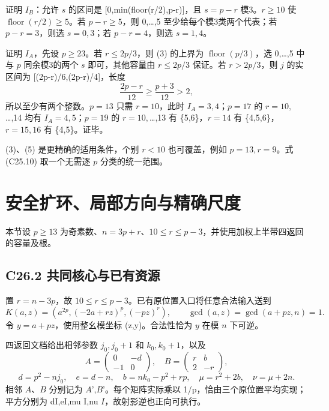 {证明} {\ensuremath{I_{B}}：允许} {\ensuremath{s}} {的区间是} {{[}0,min(floor(r/2),p-r){]}，且} {\ensuremath{s=p-r}} {模3。\ensuremath{r\ge 10}} {使} {\ensuremath{\operatorname{floor}(r/2)\ge 5}。若} {\ensuremath{p-r\ge 5}，则} {0,\ldots,5} {至少给每个模3类两个代表；若} {\ensuremath{p-r=3}，则选} {\ensuremath{s=0,3}；若} {\ensuremath{p-r=4}，则选} {\ensuremath{s=1,4}。}

{证明} {\ensuremath{I_{A}}，先设} {\ensuremath{p\ge 23}。若} {\ensuremath{r\le 2p/3}，则} {(3)} {的上界为} {\ensuremath{\operatorname{floor}(p/3)}，选} {0,\ldots,5} {中与} {\ensuremath{p}} {同余模3的两个} {\ensuremath{s}} {即可，其他容量由} {\ensuremath{r\le 2p/3}} {保证。若} {\ensuremath{r>2p/3}，则} {\ensuremath{j}} {的实区间为} {{[}(2p-r)/6,(2p-r)/4{]}，长度} \[
\frac{2p-r}{12}\ge\frac{p+3}{12}>2,
\] {所以至少有两个整数。\ensuremath{p=13}} {只需} {\ensuremath{r=10}，此时} {\ensuremath{I_{A}={3,4}}；\ensuremath{p=17}} {的} {\ensuremath{r=10,}\ldots,14} {均有} {\ensuremath{I_{A}={4,5}}；\ensuremath{p=19}} {的} {\ensuremath{r=10,}\ldots,13} {有} {\{5,6\}，\ensuremath{r=14}} {有} {\{4,5,6\}，\ensuremath{r=15,16}} {有} {\{4,5\}。证毕。}

{(3)、(5)} {是更精确的适用条件，个别} {\ensuremath{r<10}} {也可覆盖，例如} {\ensuremath{p=13,r=9}。式} {(C25.10)} {取一个无需逐} {\ensuremath{p}} {分类的统一范围。}


\section{安全扩环、局部方向与精确尺度}\label{construct:upper-local}
{本节设} \(p\ge13\) {为奇素数、}\(n=3p+r\){、}\(10\le r\le p-3\){，并使用加权上半带四返回的容量及根。}

\subsection*{\texorpdfstring{{C26.2} {共同核心与已有资源}}{C26.2 共同核心与已有资源}}\label{C26-h158}

{置} {\ensuremath{r=n-3p}，故} {\ensuremath{10\le r\le p-3}。已有原位置入口将任意合法输入送到} \[
K(a,z)=(a^{2p},(-2a+rz)^p,(-pz)^r),\qquad
\gcd(a,z)=\gcd(a+pz,n)=1.
\] {令} {\ensuremath{y=a+pz}，使用整幺模坐标} {(z,y)。合法性恰为} {\ensuremath{y}} {在模} {\ensuremath{n}} {下可逆。}

{四返回文档给出相邻参数} {\ensuremath{j_{0},j_{0}+1}} {和} {\ensuremath{k_{0},k_{0}+1}，以及} \[
A=\begin{pmatrix}0&-d\\-1&0\end{pmatrix},\quad
B=\begin{pmatrix}r&b\\2&-r\end{pmatrix},
\] \[
d=p^2-nj_0,\quad e=d-n,\quad
b=nk_0-p^2+rp,\quad \mu=r^2+2b,\quad\nu=\mu+2n.
\] {相邻} {\ensuremath{A}、\ensuremath{B}} {分别记为} {\ensuremath{A}',\ensuremath{B}'。每个矩阵实际乘以} {1/p，恰由三个原位置平均实现；平方分别为} {dI,eI,mu} {I,nu} {\ensuremath{I}，故射影逆也正向可执行。}

